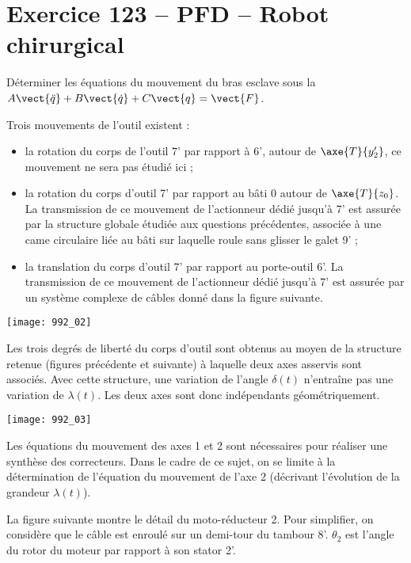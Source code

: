 \section*{Exercice 123 -- PFD -- Robot chirurgical}
\setcounter{exo}{0}

\begin{obj}
Déterminer les équations du mouvement du bras esclave sous la 
$A\vect{\ddot{q}}+B\vect{\dot{q}}+C\vect{q}=\vect{F}$.
\end{obj}


Trois mouvements de l’outil existent :
\begin{itemize}
\item la rotation du corps de l’outil 7’ par rapport à 6’, autour de $\axe{T}{y_2'}$, ce mouvement ne sera pas étudié ici ;
\item la rotation du corps d’outil 7’ par rapport au bâti 0 autour de $\axe{T}{z_0}$. La transmission de ce mouvement de
l’actionneur dédié jusqu’à 7’ est assurée par la structure globale étudiée aux questions précédentes, associée
à une came circulaire liée au bâti sur laquelle roule sans glisser le galet 9’ ;
\item la translation du corps d’outil 7’ par rapport au porte-outil 6’. La transmission de ce mouvement de l’actionneur
dédié jusqu’à 7’ est assurée par un système complexe de câbles donné dans la figure suivante.
\end{itemize}


\begin{center}
\texttt{[image: 992\_02]}
\end{center}

Les trois degrés de liberté du corps d’outil sont obtenus au moyen de la structure retenue (figures précédente et suivante) à
laquelle deux axes asservis sont associés. Avec cette structure, une variation de l’angle $\delta(t)$ n’entraîne pas une
variation de $\lambda(t)$. Les deux axes sont donc indépendants géométriquement.


\begin{center}
\texttt{[image: 992\_03]}
\end{center}

Les équations du mouvement des axes 1 et 2 sont nécessaires pour réaliser une synthèse
des correcteurs. Dans le cadre de ce sujet, on se limite à la détermination de l’équation du mouvement de l’axe
2 (décrivant l’évolution de la grandeur $\lambda(t)$).

La figure suivante montre le détail du moto-réducteur 2. Pour simplifier, on considère que le câble est enroulé sur un
demi-tour du tambour 8’. $\theta_2$ est l’angle du rotor du moteur par rapport à son stator 2’.


